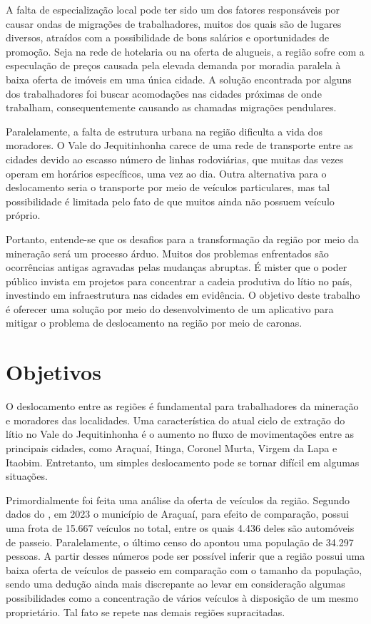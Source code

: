A falta de especialização local pode ter sido um dos fatores responsáveis por causar ondas de migrações de trabalhadores, muitos dos quais são de lugares diversos, atraídos com a possibilidade de bons salários e oportunidades de promoção. Seja na rede de hotelaria ou na oferta de alugueis, a região sofre com a especulação de preços causada pela elevada demanda por moradia paralela à baixa oferta de imóveis em uma única cidade. A solução encontrada por alguns dos trabalhadores foi buscar acomodações nas cidades próximas de onde trabalham, consequentemente causando as chamadas migrações pendulares.

Paralelamente, a falta de estrutura urbana na região dificulta a vida dos moradores. O Vale do Jequitinhonha carece de uma rede de transporte entre as cidades devido ao escasso número de linhas rodoviárias, que muitas das vezes operam em horários específicos, uma vez ao dia. Outra alternativa para o deslocamento seria o transporte por meio de veículos particulares, mas tal possibilidade é limitada pelo fato de que muitos ainda não possuem veículo próprio.

Portanto, entende-se que os desafios para a transformação da região por meio da mineração será um processo árduo. Muitos dos problemas enfrentados são ocorrências antigas agravadas pelas mudanças abruptas. É mister que o poder público invista em projetos para concentrar a cadeia produtiva do lítio no país, investindo em infraestrutura nas cidades em evidência. O objetivo deste trabalho é oferecer uma solução por meio do desenvolvimento de um aplicativo para mitigar o problema de deslocamento na região por meio de caronas.


\section{Objetivos}

O deslocamento entre as regiões é fundamental para trabalhadores da mineração e moradores das localidades. Uma característica do atual ciclo de extração do lítio no Vale do Jequitinhonha é o aumento no fluxo de movimentações entre as principais cidades, como Araçuaí, Itinga, Coronel Murta, Virgem da Lapa e Itaobim. Entretanto, um simples deslocamento pode se tornar difícil em algumas situações.

Primordialmente foi feita uma análise da oferta de veículos da região. Segundo dados do , em 2023 o município de Araçuaí, para efeito de comparação, possui uma frota de 15.667 veículos no total, entre os quais 4.436 deles são automóveis de passeio. Paralelamente, o último censo do  apontou uma população de 34.297 pessoas. A partir desses números pode ser possível inferir que a região possui uma baixa oferta de veículos de passeio em comparação com o tamanho da população, sendo uma dedução ainda mais discrepante ao levar em consideração algumas possibilidades como a concentração de vários veículos à disposição de um mesmo proprietário. Tal fato se repete nas demais regiões supracitadas.


